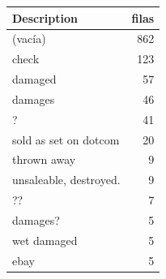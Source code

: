 \begin{tabular}{lr}
\toprule
Description & filas \\
\midrule
(vacía) & 862 \\
check & 123 \\
damaged & 57 \\
damages & 46 \\
? & 41 \\
sold as set on dotcom & 20 \\
thrown away & 9 \\
unsaleable, destroyed. & 9 \\
?? & 7 \\
damages? & 5 \\
wet damaged & 5 \\
ebay & 5 \\
\bottomrule
\end{tabular}
